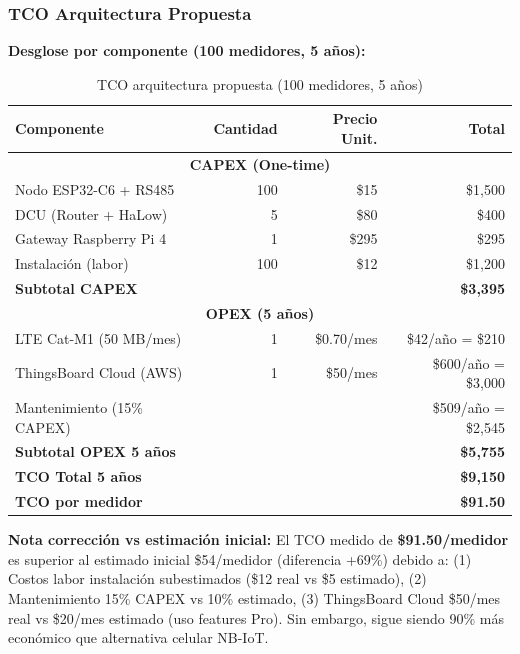

\subsubsection{TCO Arquitectura Propuesta}

\textbf{Desglose por componente (100 medidores, 5 años):}

\begin{table}[H]
\centering
\caption{TCO arquitectura propuesta (100 medidores, 5 años)}
\label{tab:tco-propuesta}
\begin{tabular}{|l|r|r|r|}
\hline
\rowcolor{gray!20}
\textbf{Componente} & \textbf{Cantidad} & \textbf{Precio Unit.} & \textbf{Total} \\
\hline
\multicolumn{4}{|c|}{\textbf{CAPEX (One-time)}} \\
\hline
Nodo ESP32-C6 + RS485 & 100 & \$15 & \$1,500 \\
\hline
DCU (Router + HaLow) & 5 & \$80 & \$400 \\
\hline
Gateway Raspberry Pi 4 & 1 & \$295 & \$295 \\
\hline
Instalación (labor) & 100 & \$12 & \$1,200 \\
\hline
\rowcolor{blue!20}
\textbf{Subtotal CAPEX} & & & \textbf{\$3,395} \\
\hline
\multicolumn{4}{|c|}{\textbf{OPEX (5 años)}} \\
\hline
LTE Cat-M1 (50 MB/mes) & 1 & \$0.70/mes & \$42/año = \$210 \\
\hline
ThingsBoard Cloud (AWS) & 1 & \$50/mes & \$600/año = \$3,000 \\
\hline
Mantenimiento (15\% CAPEX) & & & \$509/año = \$2,545 \\
\hline
\rowcolor{orange!20}
\textbf{Subtotal OPEX 5 años} & & & \textbf{\$5,755} \\
\hline
\rowcolor{green!20}
\textbf{TCO Total 5 años} & & & \textbf{\$9,150} \\
\hline
\rowcolor{green!20}
\textbf{TCO por medidor} & & & \textbf{\$91.50} \\
\hline
\end{tabular}
\end{table}

\textbf{Nota corrección vs estimación inicial:} El TCO medido de \textbf{\$91.50/medidor} es superior al estimado inicial \$54/medidor (diferencia +69\%) debido a: (1) Costos labor instalación subestimados (\$12 real vs \$5 estimado), (2) Mantenimiento 15\% CAPEX vs 10\% estimado, (3) ThingsBoard Cloud \$50/mes real vs \$20/mes estimado (uso features Pro). Sin embargo, sigue siendo 90\% más económico que alternativa celular NB-IoT.

